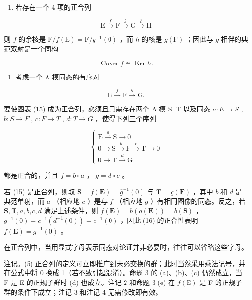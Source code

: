 \begin{enumerate}
\def\labelenumi{(\arabic{enumi})}
\setcounter{enumi}{2}
\tightlist
\item
  若存在一个 4 项的正合列
\end{enumerate}

\[
\mathrm{E} \xrightarrow {f} \mathrm{F} \xrightarrow {g} \mathrm{G} \xrightarrow {h} \mathrm{H}
\]

则 \(f\) 的余核是 \(\mathrm{F} / f(\mathrm{E}) = \mathrm{F} / g^{-1}(0)\) ，而 \(h\) 的核是 \(g(\mathrm{F})\) ；因此与 \(g\) 相伴的典范双射是一个同构

\[
\operatorname{Coker} f \cong \operatorname{Ker} h.
\]

\begin{enumerate}
\def\labelenumi{(\arabic{enumi})}
\setcounter{enumi}{3}
\tightlist
\item
  考虑一个 A-模同态的有序对
\end{enumerate}

\[
\mathrm{E} \xrightarrow {f} \mathrm{F} \xrightarrow {g} \mathrm{G}.\tag{15}
\]

要使图表 (15) 成为正合列，必须且只需存在两个 A-模 S, T 以及同态 \(a:E\to S\) , \(b:S\to F\) , \(c:F\to T\) , \(d:T\to G\) ，使得下列三个序列

\[
\left\{ \begin{array}{c} \mathrm{E} \xrightarrow {a} \mathrm{S} \longrightarrow 0 \\ 0 \longrightarrow \mathrm{S} \xrightarrow {b} \mathrm{F} \xrightarrow {c} \mathrm{T} \longrightarrow 0 \\ 0 \longrightarrow \mathrm{T} \xrightarrow {d} \mathrm{G} \end{array} \right.\tag{16}
\]

都是正合的，并且 \(f = b \circ a\) ， \(g = d \circ c\) 。

若 (15) 是正合列，则取 \(\mathbf{S} = f(\mathbf{E}) = \overline{g}^{-1}(0)\) 与 \(\mathbf{T} = g(\mathbf{F})\) ，其中 \(b\) 和 \(d\) 是典范单射，而 \(a\) （相应地 \(c\) ）是与 \(f\) （相应地 \(g\) ）有相同图像的同态。反之，若 \(\mathbf{S}, \mathbf{T}, a, b, c, d\) 满足上述条件，则 \(f(\mathbf{E}) = b(a(\mathbf{E})) = b(\mathbf{S})\) ， \(g^{-1}(0) = c^{-1}(d^{-1}(0)) = c^{-1}(0)\) ，因此 (16) 的正合性表明 \(f(\mathbf{E}) = \overline{g}^{-1}(0)\) 。

在正合列中，当用显式字母表示同态对论证并非必要时，往往可以省略这些字母。

注记。(5) 正合列的定义可立即推广到未必交换的群；此时当然采用乘法记号，并在公式中将 0 换成 1（若不致引起混淆）。命题 3 的 (a)、(b)、(c) 仍然成立，当 F 是 E 的正规子群时 (d) 也成立。注记 2 和命题 3 (e) 在 \(f(\mathrm{E})\) 是 F 的正规子群的条件下成立；注记 3 和注记 4 无需修改即有效。

